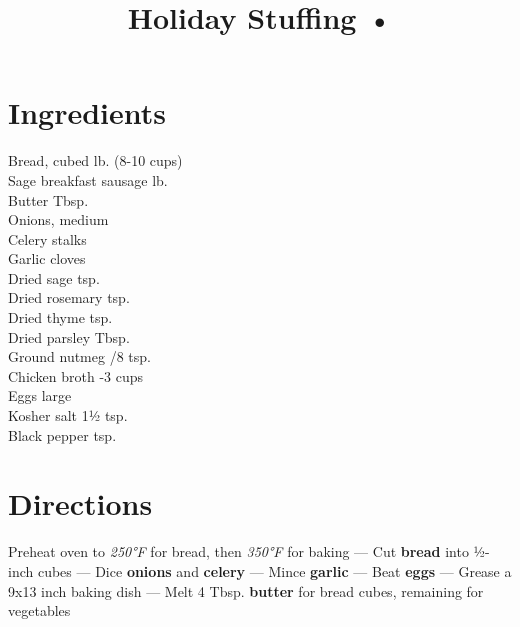 \documentclass[11pt,letterpaper]{article}
\title{Holiday Stuffing  •}
\author{}
\date{}
\begin{document}
\maketitle
\thispagestyle{empty}

\section*{Ingredients}
\setlength{\columnsep}{20pt}
\begin{multicols}{2}
\noindent
    Bread, cubed  lb. (8-10 cups) \\
    Sage breakfast sausage  lb. \\
    Butter  Tbsp. \\
    Onions, medium  \\
    Celery stalks  \\
    Garlic cloves  \\
    \columnbreak
    Dried sage  tsp. \\
    Dried rosemary  tsp. \\
    Dried thyme  tsp. \\
    Dried parsley  Tbsp. \\
    Ground nutmeg /8 tsp. \\
    Chicken broth -3 cups \\
    Eggs  large \\
    Kosher salt \dotfill 1½ tsp. \\
    Black pepper  tsp.
\end{multicols}

\section*{Directions}

\noindent
Preheat oven to \textit{250°F} for bread, then \textit{350°F} for baking ---
Cut \textbf{bread} into ½-inch cubes ---
Dice \textbf{onions} and \textbf{celery} ---
Mince \textbf{garlic} ---
Beat \textbf{eggs} ---
Grease a 9x13 inch baking dish ---
Melt 4 Tbsp. \textbf{butter} for bread cubes, remaining for vegetables
\end{document}
